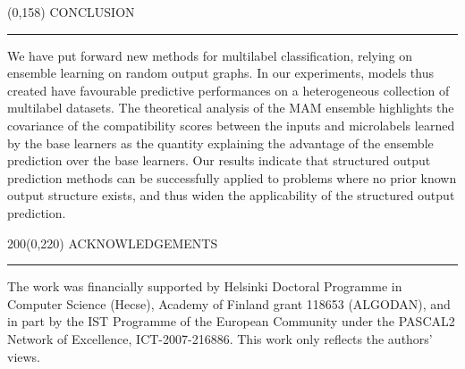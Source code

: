 \documentclass[a4poster]{article}
\begin{document}
\begin{textblock}{60}(0,158)
	\sffamily
	\Large{\color{sciorange}CONCLUSION}\small\\
	\rule[3mm]{60mm}{0.1pt}
	\begin{multicols}{2}
	\end{multicols}
	\vspace{-13mm}
	\footnotesize
	We have put forward new methods for multilabel classification, relying on ensemble learning on random output graphs. 
	In our experiments, models thus created have favourable predictive performances on a heterogeneous collection of multilabel datasets.
	The theoretical analysis of the MAM ensemble highlights the covariance of the compatibility scores between the inputs and microlabels learned by the base learners as the quantity explaining the advantage of the ensemble prediction over the base learners.
	Our results indicate that structured output prediction methods can be successfully applied to problems where no prior known output structure exists, and thus widen the applicability of the structured output prediction. 
\end{textblock}

\begin{textblock}{200}(0,220)
	\sffamily
	\Large{\color{sciorange}ACKNOWLEDGEMENTS}\small\\
	\rule[3mm]{200mm}{0.1pt}

	\begin{multicols}{2}
	\end{multicols}
	\vspace{-13mm}
	\footnotesize
	The work was financially supported by Helsinki Doctoral Programme in Computer Science (Hecse), Academy of Finland grant 118653 (ALGODAN), and in part by the IST Programme of the European Community under the PASCAL2 Network of Excellence, ICT-2007-216886. This work only reflects the authors' views.
	
\end{textblock}
\end{document}
